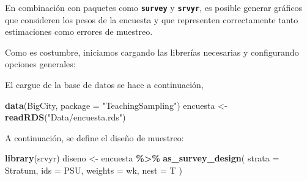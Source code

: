 \documentclass[
  spanish,
  12pt,
]{book}
\newenvironment{Shaded}{\begin{snugshade}}{\end{snugshade}}
\newcommand{\AttributeTok}[1]{\textcolor[rgb]{0.13,0.29,0.53}{#1}}
\newcommand{\CommentTok}[1]{\textcolor[rgb]{0.56,0.35,0.01}{\textit{#1}}}
\newcommand{\DecValTok}[1]{\textcolor[rgb]{0.00,0.00,0.81}{#1}}
\newcommand{\FunctionTok}[1]{\textcolor[rgb]{0.13,0.29,0.53}{\textbf{#1}}}
\newcommand{\NormalTok}[1]{#1}
\newcommand{\OtherTok}[1]{\textcolor[rgb]{0.56,0.35,0.01}{#1}}
\newcommand{\SpecialCharTok}[1]{\textcolor[rgb]{0.81,0.36,0.00}{\textbf{#1}}}
\newcommand{\StringTok}[1]{\textcolor[rgb]{0.31,0.60,0.02}{#1}}
\begin{document}
En combinación con paquetes como \textbf{\texttt{survey}} y \textbf{\texttt{srvyr}}, es posible generar gráficos que consideren los pesos de la encuesta y que representen correctamente tanto estimaciones como errores de muestreo.

Como es costumbre, iniciamos cargando las librerías necesarias y configurando opciones generales:

\begin{Shaded}
\end{Shaded}

El cargue de la base de datos se hace a continuación,

\begin{Shaded}
\begin{Highlighting}[]
\FunctionTok{data}\NormalTok{(BigCity, }\AttributeTok{package =} \StringTok{"TeachingSampling"}\NormalTok{)}
\NormalTok{encuesta }\OtherTok{\textless{}{-}} \FunctionTok{readRDS}\NormalTok{(}\StringTok{"Data/encuesta.rds"}\NormalTok{)}
\end{Highlighting}
\end{Shaded}

A continuación, se define el diseño de muestreo:

\begin{Shaded}
\begin{Highlighting}[]
\FunctionTok{library}\NormalTok{(srvyr)}
\NormalTok{diseno }\OtherTok{\textless{}{-}}\NormalTok{ encuesta }\SpecialCharTok{\%\textgreater{}\%}
  \FunctionTok{as\_survey\_design}\NormalTok{(}
    \AttributeTok{strata =}\NormalTok{ Stratum,}
    \AttributeTok{ids =}\NormalTok{ PSU,}
    \AttributeTok{weights =}\NormalTok{ wk,}
    \AttributeTok{nest =}\NormalTok{ T}
\NormalTok{  )}
\end{Highlighting}
\end{Shaded}
\end{document}
